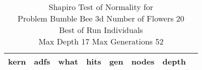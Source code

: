 \begin{table}[H]
\caption{Shapiro Test of Normality for \\ Problem  Bumble Bee 3d  Number of Flowers 20\\Best of Run Individuals \\ Max Depth 17 Max Generations 52\\}
\begin{center}
\scalebox{0.8} %
{
\begin{tabular}{lrrrrrrr}
\hline
kern & adfs & what & hits & gen & nodes & depth \\
\hline


\end{tabular}
}
\end{center}
\end{table}

